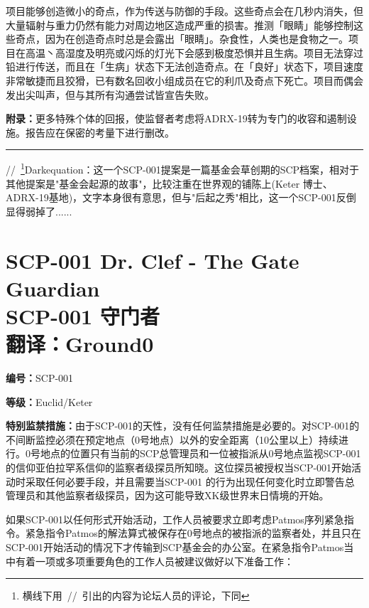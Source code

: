 \documentclass[openany,a4paper]{book} %
\newcounter{mychapter} %
\begin{document}
项目能够创造微小的奇点，作为传送与防御的手段。这些奇点会在几秒内消失，但大量辐射与重力仍然有能力对周边地区造成严重的损害。推测「眼睛」能够控制这些奇点，因为在创造奇点时总是会露出「眼睛」。杂食性，人类也是食物之一。项目在高温丶高湿度及明亮或闪烁的灯光下会感到极度恐惧并且生病。项目无法穿过铅进行传送，而且在「生病」状态下无法创造奇点。在「良好」状态下，项目速度非常敏捷而且狡猾，已有数名回收小组成员在它的利爪及奇点下死亡。项目而偶会发出尖叫声，但与其所有沟通尝试皆宣告失败。\vspace{12pt}

\textbf{附录：}更多特殊个体的回报，使监督者考虑将ADRX-19转为专门的收容和遏制设施。报告应在保密的考量下进行删改。\vspace{12pt}

\hrule\vspace{12pt}

//~\footnote{横线下用~//~引出的内容为论坛人员的评论，下同}Darkequation：这一个SCP-001提案是一篇基金会草创期的SCP档案，相对于其他提案是"基金会起源的故事"，比较注重在世界观的铺陈上(Keter 博士、ADRX-19基地)，文字本身很有意思，但与"后起之秀"相比，这一个SCP-001反倒显得弱掉了......

\addtocounter{mychapter}{1}
\chapter[SCP-001 守门者]{SCP-001 Dr. Clef - The Gate Guardian \\ SCP-001 守门者 \\ 翻译：Ground0}\label{chap:SCP-001-3}

\textbf{编号：}SCP-001\vspace{12pt}

\textbf{等级：}Euclid/Keter\vspace{12pt}

\textbf{特别监禁措施：}由于SCP-001的天性，没有任何监禁措施是必要的。对SCP-001的不间断监控必须在预定地点（0号地点）以外的安全距离（10公里以上）持续进行。0号地点的位置只有当前的SCP总管理员和一位被指派从0号地点监视SCP-001的信仰亚伯拉罕系信仰的监察者级探员所知晓。这位探员被授权当SCP-001开始活动时采取任何必要手段，并且需要当SCP-001 的行为出现任何变化时立即警告总管理员和其他监察者级探员，因为这可能导致XK级世界末日情境的开始。\vspace{12pt}

如果SCP-001以任何形式开始活动，工作人员被要求立即考虑Patmos序列紧急指令。紧急指令Patmos的解法算式被保存在0号地点的被指派的监察者处，并且只在SCP-001开始活动的情况下才传输到SCP基金会的办公室。在紧急指令Patmos当中有着一项或多项重要角色的工作人员被建议做好以下准备工作：
\end{document}
